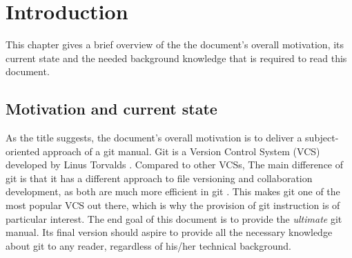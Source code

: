 \chapter{Introduction}
\label{cha:introduction}
This chapter gives a brief overview of the the document's overall motivation, its current state and the needed background knowledge that is required to read this document.

\section{Motivation and current state}
As the title suggests, the document's overall motivation is to deliver a subject-oriented approach of a git manual.
Git is a Version Control System (VCS) developed by Linus Torvalds \cite{LM12}. Compared to other VCSs, The main difference of git is that it has a different approach to file versioning and collaboration development, as both are much more efficient in git \cite{CS20}.
This makes git one of the most popular VCS out there, which is why the provision of git instruction is of particular interest.
The end goal of this document is to provide the \textit{ultimate} git manual. Its final version should aspire to provide all the necessary knowledge about git to any reader, regardless of his/her technical background.

